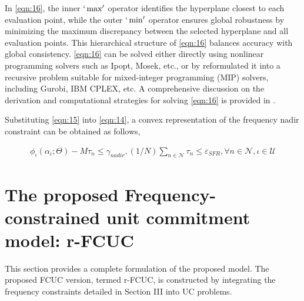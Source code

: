 \documentclass[lettersize,journal]{IEEEtran}
\begin{document}
In \eqref{eqn:16}, the inner \(`\max'\) operator identifies the hyperplane closest to each evaluation point, while the outer \(`\min'\) operator ensures global robustness by minimizing the maximum discrepancy between the selected hyperplane and all evaluation points. This hierarchical structure of \eqref{eqn:16} balances accuracy with global consistency. \eqref{eqn:16} can be solved either directly using nonlinear programming solvers such as Ipopt, Mosek, etc., or by reformulated it into a recursive problem suitable for mixed-integer programming (MIP) solvers, including Gurobi, IBM CPLEX, etc. A comprehensive discussion on the derivation and computational strategies for solving \eqref{eqn:16} is provided in \cite{9765359}.

Substituting \eqref{eqn:15} into \eqref{eqn:14}, a convex representation of the frequency nadir constraint can be obtained as follows,

\vspace{-0.125in}
	\begin{small} \begin{align}
		\!\!\!\!\!\!\phi_{\iota}(\alpha_{\iota}; \varTheta) \!\!-\!\! M\tau_{n}\!\! \leq \!\!\gamma_{nadir},({1}/{{N}})\!\!\sum\nolimits_{n\in\mathcal{N}}\!\!\! \tau_{n} \!\!\leq\!\! \varepsilon_{SFR},
		  \forall n \!\!\in\!\! \mathcal{N},\iota\!\in\!\mathcal{U}\label{eqn:17}
	\end{align}
\end{small}

\vspace{-0.125in} \section{The proposed Frequency-constrained unit commitment model: r-FCUC}


This section provides a complete formulation of the proposed model. The proposed FCUC version, termed r-FCUC, is constructed by integrating the frequency constraints detailed in Section III into UC problems.
\end{document}
